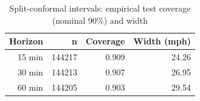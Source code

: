 \begin{table}[t]\centering\caption{Split-conformal intervals: empirical test coverage (nominal 90\%) and width}\label{tab:unc}
\begin{tabular}{rrrr}\toprule Horizon & n & Coverage & Width (mph) \\ \midrule
15 min & 144217 & 0.909 & 24.26 \\
30 min & 144213 & 0.907 & 26.95 \\
60 min & 144205 & 0.903 & 29.54 \\
\bottomrule\end{tabular}\end{table}
